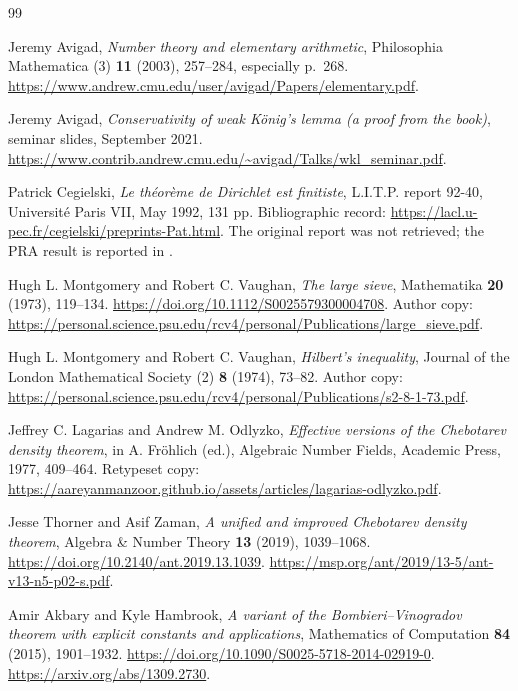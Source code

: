 \begin{thebibliography}{99}

Jeremy Avigad, \emph{Number theory and elementary arithmetic},
Philosophia Mathematica (3) \textbf{11} (2003), 257--284, especially p.~268.
\url{https://www.andrew.cmu.edu/user/avigad/Papers/elementary.pdf}.

Jeremy Avigad, \emph{Conservativity of weak K\"onig's lemma (a proof from the book)},
seminar slides, September 2021.
\url{https://www.contrib.andrew.cmu.edu/~avigad/Talks/wkl_seminar.pdf}.

Patrick Cegielski, \emph{Le th\'eor\`eme de Dirichlet est finitiste},
L.I.T.P. report 92-40, Universit\'e Paris VII, May 1992, 131 pp.
Bibliographic record:
\url{https://lacl.u-pec.fr/cegielski/preprints-Pat.html}.
The original report was not retrieved; the PRA result is reported in
\cite{Avigad2003}.

Hugh L. Montgomery and Robert C. Vaughan, \emph{The large sieve},
Mathematika \textbf{20} (1973), 119--134.
\url{https://doi.org/10.1112/S0025579300004708}.
Author copy:
\url{https://personal.science.psu.edu/rcv4/personal/Publications/large_sieve.pdf}.

Hugh L. Montgomery and Robert C. Vaughan, \emph{Hilbert's inequality},
Journal of the London Mathematical Society (2) \textbf{8} (1974), 73--82.
Author copy:
\url{https://personal.science.psu.edu/rcv4/personal/Publications/s2-8-1-73.pdf}.

Jeffrey C. Lagarias and Andrew M. Odlyzko,
\emph{Effective versions of the Chebotarev density theorem},
in A. Fr\"ohlich (ed.), Algebraic Number Fields, Academic Press, 1977,
409--464. Retypeset copy:
\url{https://aareyanmanzoor.github.io/assets/articles/lagarias-odlyzko.pdf}.

Jesse Thorner and Asif Zaman,
\emph{A unified and improved Chebotarev density theorem},
Algebra \& Number Theory \textbf{13} (2019), 1039--1068.
\url{https://doi.org/10.2140/ant.2019.13.1039}.
\url{https://msp.org/ant/2019/13-5/ant-v13-n5-p02-s.pdf}.

Amir Akbary and Kyle Hambrook,
\emph{A variant of the Bombieri--Vinogradov theorem with explicit constants and applications},
Mathematics of Computation \textbf{84} (2015), 1901--1932.
\url{https://doi.org/10.1090/S0025-5718-2014-02919-0}.
\url{https://arxiv.org/abs/1309.2730}.


\end{thebibliography}
